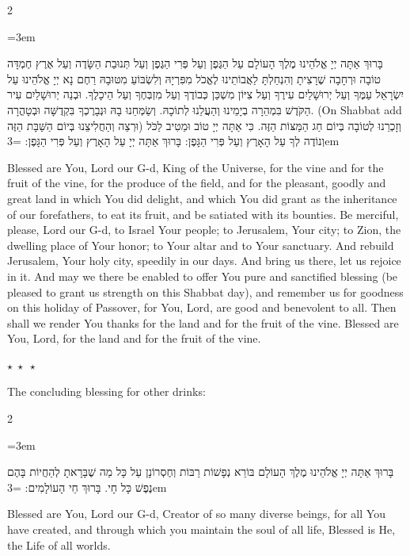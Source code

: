 \documentclass[11pt, openany]{book}
\newcommand{\instruction}[1]{%
  \par\vspace{3pt}
  \begin{tcolorbox}[
    enhanced,
    breakable,
    colback=sederlight,
    colframe=sedergold!40,
    boxrule=1pt,
    left=10pt,
    right=6pt,
    top=4pt,
    bottom=4pt,
    borderline west={3pt}{0pt}{sederwine!60},
    arc=6pt,
    outer arc=6pt,
  ]
    {\kidsinstructionfont\small\textcolor{sederwine}{#1}}
  \end{tcolorbox}
  \par\vspace{2pt}
}
\newenvironment{bilingual}{%
  \par\vspace{4pt}%
  \begin{paracol}{2}%
}{%
  \end{paracol}%
  \par\vspace{2pt}%
}
\newenvironment{hebrewcol}{%
  \switchcolumn[1]%
  \begingroup
  \RTL
  \hebrewfont\large
  \setstretch{1.4}%
  \emergencystretch=3em
  \tolerance=9999
  \parindent=0pt\relax
}{%
  \endRTL
  \endgroup
}
\newenvironment{englishcol}{%
  \switchcolumn[0]%
  \begingroup
  \setstretch{1.4}%
  \emergencystretch=3em
  \tolerance=9999
  \normalsize
  \rightskip=0.12in\relax
}{%
  \endgroup
}
\newcommand{\parasep}{%
  \par\vspace{3pt}
  \begin{center}
    \textcolor{sedergold!50}{\small$\star\;\star\;\star$}
  \end{center}
  \par\vspace{3pt}
}
\begin{document}
\begin{bilingual}
\begin{hebrewcol}
בָּרוּךְ אַתָּה יְיָ אֱלֹהֵינוּ מֶלֶךְ הָעוֹלָם עַל הַגֶּפֶן וְעַל פְּרִי הַגֶּפֶן וְעַל תְּנוּבַת הַשָּׂדֶה וְעַל אֶרֶץ חֶמְדָּה טוֹבָה וּרְחָבָה שֶׁרָצִיתָ וְהִנְחַלְתָּ לַאֲבוֹתֵינוּ לֶאֱכֹל מִפִּרְיָהּ וְלִשְׂבּוֹעַ מִטּוּבָהּ רַחֶם נָא יְיָ אֱלֹהֵינוּ עַל יִשְׂרָאֵל עַמֶּךָ וְעַל יְרוּשָׁלַיִם עִירֶךָ וְעַל צִיּוֹן מִשְׁכַּן כְּבוֹדֶךָ וְעַל מִזְבְּחֶךָ וְעַל הֵיכָלֶךָ. וּבְנֵה יְרוּשָׁלַיִם עִיר הַקֹּדֶשׁ בִּמְהֵרָה בְיָמֵינוּ וְהַעֲלֵנוּ לְתוֹכָהּ. וְשַׂמְּחֵנוּ בָהּ וּנְבָרֶכְךָ בִּקְדֻשָּׁה וּבְטָהֳרָה. (On Shabbat add וּרְצֵה וְהַחֲלִיצֵנוּ בְּיוֹם הַשַּׁבָּת הַזֶּה) וְזָכְרֵנוּ לְטוֹבָה בְּיוֹם חַג הַמַּצּוֹת הַזֶּה. כִּי אַתָּה יְיָ טוֹב וּמֵטִיב לַכֹּל וְנוֹדֶה לְךָ עַל הָאָרֶץ וְעַל פְּרִי הַגָּפֶן: בָּרוּךְ אַתָּה יְיָ עַל הָאָרֶץ וְעַל פְּרִי הַגָּפֶן:
\end{hebrewcol}
\begin{englishcol}
Blessed are You, Lord our G-d, King of the Universe, for the vine and for the fruit of the vine, for the produce of the field, and for the pleasant, goodly and great land in which You did delight, and which You did grant as the inheritance of our forefathers, to eat its fruit, and be satiated with its bounties. Be merciful, please, Lord our G-d, to Israel Your people; to Jerusalem, Your city; to Zion, the dwelling place of Your honor; to Your altar and to Your sanctuary. And rebuild Jerusalem, Your holy city, speedily in our days. And bring us there, let us rejoice in it. And may we there be enabled to offer You pure and sanctified blessing (be pleased to grant us strength on this Shabbat day), and remember us for goodness on this holiday of Passover, for You, Lord, are good and benevolent to all. Then shall we render You thanks for the land and for the fruit of the vine. Blessed are You, Lord, for the land and for the fruit of the vine.
\end{englishcol}
\end{bilingual}
\parasep

\instruction{The concluding blessing for other drinks:}

\begin{bilingual}
\begin{hebrewcol}
בָּרוּךְ אַתָּה יְיָ אֱלֹהֵינוּ מֶלֶךְ הָעוֹלָם בּוֹרֵא נְפָשׁוֹת רַבּוֹת וְחֶסְרוֹנָן עַל כָּל מַה שֶׁבָּרָאתָ לְהַחֲיוֹת בָּהֶם נֶפֶשׁ כָּל חָי. בָּרוּךְ חֵי הָעוֹלָמִים:
\end{hebrewcol}
\begin{englishcol}
Blessed are You, Lord our G-d, Creator of so many diverse beings, for all You have created, and through which you maintain the soul of all life, Blessed is He, the Life of all worlds.
\end{englishcol}
\end{bilingual}
\vspace{10pt}
\begin{center}
\textcolor{sedergold}{}
\end{center}
\vspace{6pt}
\end{document}
